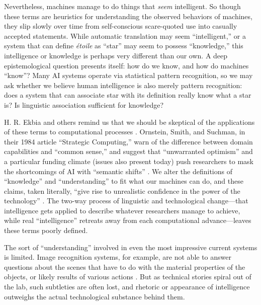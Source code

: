 Nevertheless, machines manage to do things that \emph{seem} intelligent. So
though these terms are heuristics for understanding the observed
behaviors of machines, they slip slowly over time from self-conscious
scare-quoted use into casually accepted statements. While automatic
translation may seem ``intelligent,'' or a system that can define \emph{\'{e}toile}
as ``star'' may seem to possess ``knowledge,'' this intelligence or
knowledge is perhaps very different than our own. A deep
epistemological question presents itself: how do we know, and how do
machines ``know''? Many AI systems operate via statistical pattern
recognition, so we may ask whether we believe human intelligence is
also merely pattern recognition: does a system that can associate star
with its definition really know what a star is? Is linguistic
association sufficient for knowledge?


H. R. Ekbia and others remind us that we should be skeptical of the
applications of these terms to computational processes \cite{ekbia}.
Ornstein, Smith, and Suchman, in their 1984 
article ``Strategic Computing,'' warn of the difference between domain
capabilities and ``common sense,'' and suggest that ``unwarranted
optimism'' and a particular funding climate (issues also present today)
push researchers to mask the shortcomings of AI with ``semantic
shifts'' \cite[p. 14]{ornstein}. We alter the definitions of ``knowledge'' and ``understanding''
to fit what our machines can do, and these claims, taken literally,
``give rise to unrealistic confidence in the power of the
technology'' \cite[p. 15]{ornstein}.
The two-way process of linguistic and technological change---that
intelligence gets applied to describe whatever researchers manage to
achieve, while real ``intelligence'' retreats away from each
computational advance---leaves these terms poorly defined.

The sort of ``understanding''
involved in even the most impressive current systems is limited. Image
recognition systems, for example, are not
able to answer questions about the scenes that have to do with
the material properties of the objects, or likely results of various
actions \cite{gomesJordan}. But as technical stories spiral out of the
lab, such subtleties are often lost, and rhetoric or appearance of
intelligence outweighs the actual technological substance behind them.

